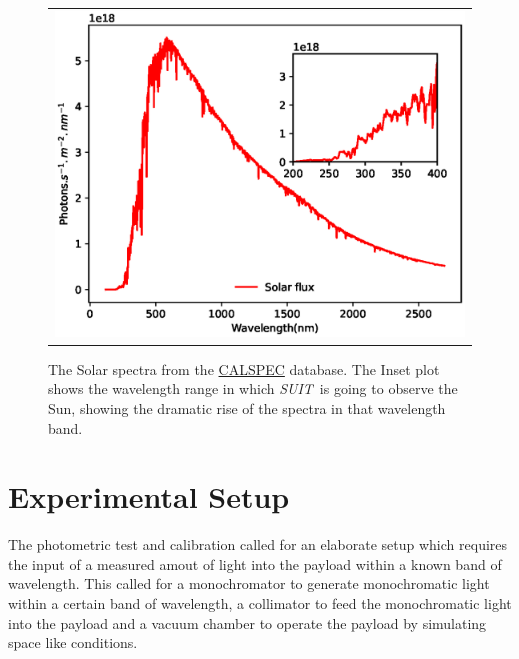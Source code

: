 \documentclass[12pt]{spieman}  %
\newcommand{\suit}{{\it{SUIT}}}
\begin{document}
\begin{figure}[ht!]
\begin{center}
\begin{tabular}{c}
\includegraphics[width=0.8\linewidth]{spectrum_sun.eps}
\end{tabular}
\end{center}
\caption 
{ \label{fig:sun_spec} The Solar spectra from the \href{https://www.stsci.edu/hst/instrumentation/reference-data-for-calibration-and-tools/astronomical-catalogs/calspec}{CALSPEC} database. The Inset plot shows the wavelength range in which \suit~is going to observe the Sun, showing the dramatic rise of the spectra in that wavelength band.} 
\end{figure} 

\section{Experimental Setup}\label{sec:setup}

The photometric test and calibration called for an elaborate setup which requires the input of a measured amout of light into the payload within a known band of wavelength. This called for a monochromator to generate monochromatic light within a certain band of wavelength, a collimator to feed the monochromatic light into the payload and a vacuum chamber to operate the payload by simulating space like conditions.
\end{document}
